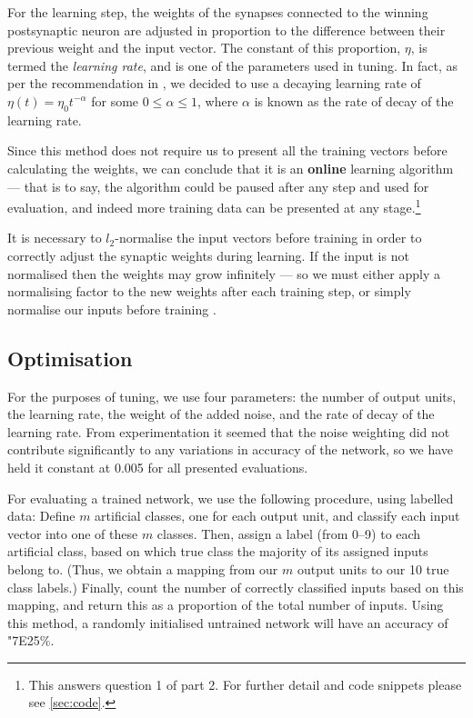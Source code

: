 \documentclass[a4paper, 11pt, twocolumn, final]{article} %
\begin{document}
For the learning step, the weights of the synapses connected to the winning
postsynaptic neuron are adjusted in proportion to the difference between their
previous weight and the input vector.  The constant of this proportion, $\eta$,
is termed the \textit{learning rate}, and is one of the parameters used in
tuning.  In fact, as per the recommendation in \cite[p223]{hertz91}, we decided to use a
decaying learning rate of $\eta(t) = \eta_0t^{-\alpha}$ for some $0 \le \alpha
\le 1$, where $\alpha$ is known as the rate of decay of the learning rate.

Since this method does not require us to present all the training vectors before
calculating the weights, we can conclude that it is an \textbf{online} learning
algorithm --- that is to say, the algorithm could be paused after any step and
used for evaluation, and indeed more training data can be presented at any
stage.\footnote{This answers question 1 of part 2.  For further detail and code
snippets please see \autoref{sec:code}.}

It is necessary to $l_2$-normalise the input vectors before training in
order to correctly adjust the synaptic weights during learning.  If the input is
not normalised then the weights may grow infinitely --- so we must either apply
a normalising factor to the new weights after each training step, or simply
normalise our inputs before training \cite[p219]{hertz91}.

\subsection{Optimisation}

For the purposes of tuning, we use four parameters: the number of output units,
the learning rate, the weight of the added noise, and the rate of decay of the
learning rate.  From experimentation it seemed that the noise weighting did not
contribute significantly to any variations in accuracy of the network, so we
have held it constant at 0.005 for all presented evaluations.

For evaluating a trained network, we use the following procedure, using labelled
data:  Define $m$ artificial classes, one for each output unit, and classify
each input vector into one of these $m$ classes.  Then, assign a label (from
0--9) to each artificial class, based on which true class the majority of its
assigned inputs belong to.  (Thus, we obtain a mapping from our $m$ output units
to our 10 true class labels.)  Finally, count the number of correctly classified
inputs based on this mapping, and return this as a proportion of the total
number of inputs.  Using this method, a randomly initialised untrained network
will have an accuracy of \char"7E{}25\%.
\end{document}
